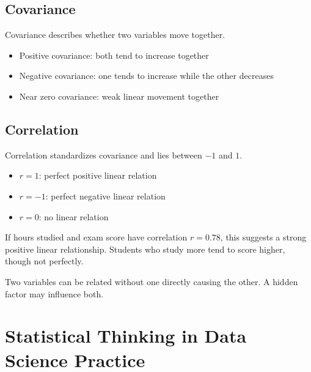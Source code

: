 \documentclass[11pt,a4paper]{article}
\begin{document}
\subsection{Covariance}

Covariance describes whether two variables move together.

\begin{itemize}[leftmargin=*]
  \item Positive covariance: both tend to increase together
  \item Negative covariance: one tends to increase while the other decreases
  \item Near zero covariance: weak linear movement together
\end{itemize}

\subsection{Correlation}

Correlation standardizes covariance and lies between $-1$ and $1$.

\begin{itemize}[leftmargin=*]
  \item $r = 1$: perfect positive linear relation
  \item $r = -1$: perfect negative linear relation
  \item $r = 0$: no linear relation
\end{itemize}

\begin{examplebox}
If hours studied and exam score have correlation $r = 0.78$, this suggests a strong positive linear relationship. Students who study more tend to score higher, though not perfectly.
\end{examplebox}

\begin{alertbox}
Two variables can be related without one directly causing the other. A hidden factor may influence both.
\end{alertbox}

\section{Statistical Thinking in Data Science Practice}
\end{document}
